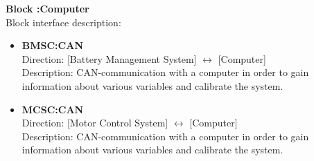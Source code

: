 \textbf{Block :Computer}\\
Block interface description:
\begin{itemize}
	\item \textbf{BMSC:CAN}\\
	Direction: [Battery Management System] $\leftrightarrow$ [Computer]\\
	Description: CAN-communication with a computer in order to gain information about various variables and calibrate the system.
	\item \textbf{MCSC:CAN}\\
	Direction: [Motor Control System] $\leftrightarrow$ [Computer]\\
	Description: CAN-communication with a computer in order to gain information about various variables and calibrate the system.
\end{itemize}